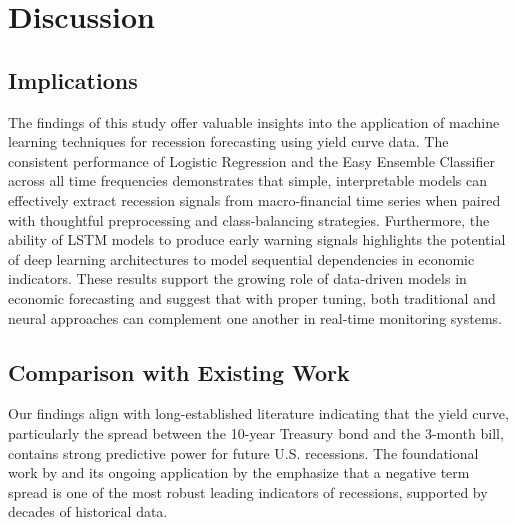 
\section{Discussion}

\begin{comment}
\begin{itemize}
    \item Implications: Discuss the broader implications of your findings for the field.
    \item Comparison with Existing Work: Compare your results to the literature or previous studies you reviewed.
    \item Limitations: Acknowledge any limitations in your study (e.g., sample size, methodology constraints).
\end{itemize}
\end{comment}








\subsection{Implications}

The findings of this study offer valuable insights into the application of machine learning techniques for recession forecasting using yield curve data. The consistent performance of Logistic Regression and the Easy Ensemble Classifier across all time frequencies demonstrates that simple, interpretable models can effectively extract recession signals from macro-financial time series when paired with thoughtful preprocessing and class-balancing strategies. Furthermore, the ability of LSTM models %
to produce early warning signals highlights the potential of deep learning architectures to model sequential dependencies in economic indicators. These results support the growing role of data-driven models in economic forecasting and suggest that with proper tuning, both traditional and neural approaches can complement one another in real-time monitoring systems.


\subsection{Comparison with Existing Work}

Our findings align with long-established literature indicating that the yield curve, particularly the spread between the 10-year Treasury bond and the 3-month bill, contains strong predictive power for future U.S. recessions. The foundational work by \textcite{estrella1998predicting} and its ongoing application by the \FRED %
emphasize that a negative term spread is one of the most robust leading indicators of recessions, supported by decades of historical data.

